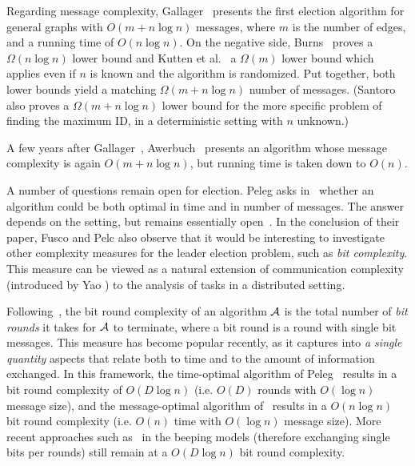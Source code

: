 \documentclass[11pt,envcountsame,letterpaper]{llncs}
\begin{document}
Regarding message complexity, 
Gallager~\cite{Gallager} presents
 the first election 
algorithm for general graphs with $O(m+n\log n)$ messages, 
where $m$ is the number of edges, and a running time of $O(n\log n)$.
On the negative side, Burns~\cite{burns1980} proves a $\Omega(n\log n)$ lower bound and Kutten et al.~\cite{KPPRT15} a $\Omega(m)$ lower bound which applies even if $n$ is known and the algorithm is randomized. Put together, both lower bounds yield a matching $\Omega(m + n\log n)$ number of messages. (Santoro~\cite{Santoro84} also proves a $\Omega(m+n\log n)$ lower bound for the more specific problem of finding the maximum ID, in a deterministic setting with $n$ unknown.)

A few years after Gallager~\cite{Gallager}, Awerbuch~\cite{Awer87} presents an algorithm whose message complexity is again $O(m+n\log n)$, but running time is taken down to $O(n)$.

A number of questions remain open for election. Peleg asks in~\cite{Peleg90}
whether an algorithm could be both optimal in time and in number of messages.
The answer depends on the setting, but remains essentially open~\cite{KPPRT15}.
In the conclusion of their paper, Fusco and Pelc \cite{FP15} also observe that
it would be interesting to investigate other complexity
measures for the leader election problem, such as {\em bit complexity}.
This measure can be viewed as a natural
extension of communication complexity (introduced by Yao \cite{Yao})
to the analysis of tasks in a distributed setting.

Following~\cite{KOSS}, the bit round complexity of an algorithm $\cal A$ is the total number of {\it bit rounds} it takes for $\cal A$ to terminate, where a bit round is a round with single bit messages. 
This measure has become popular recently, as it captures into {\em a single quantity} aspects that relate both to time and to the amount of information exchanged.
In this framework, the time-optimal algorithm of Peleg~\cite{Peleg90} results in a bit round complexity of $O(D\log n)$ (i.e. $O(D)$ rounds with $O(\log n)$ message size), and the message-optimal algorithm of~\cite{Awer87} results in a $O(n\log n)$ bit round complexity (i.e. $O(n)$ time with $O(\log n)$ message size). More recent approaches such as~\cite{FSW14} in the beeping models (therefore exchanging single bits per rounds) still remain at a $O(D\log n)$ bit round complexity.
\end{document}
